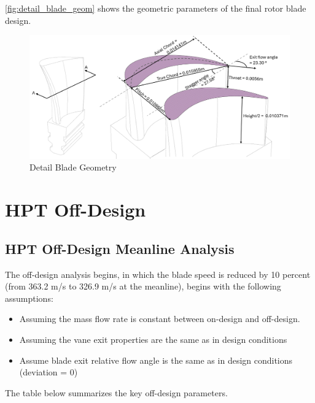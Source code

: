\documentclass[12pt, letter]{report}
\begin{document}
\autoref{fig:detail_blade_geom} shows the geometric parameters of the final rotor blade design.
\begin{figure}[H]
    \centering
    \includegraphics[width=0.99\linewidth]{figures/blade_detail_geom.png}
    \caption{Detail Blade Geometry}
    \label{fig:detail_blade_geom}
\end{figure}


\clearpage

\section{HPT Off-Design}
\subsection{HPT Off-Design Meanline Analysis}

 The off-design analysis begins, in which the blade speed is reduced by 10 percent (from 363.2 m/s to 326.9 m/s at the meanline), begins with the following assumptions:
\begin{itemize}
\item Assuming the mass flow rate is constant between on-design and off-design.
\item Assuming the vane exit properties are the same as in design conditions
\item Assume blade exit relative flow angle is the same as in design conditions (deviation = 0)
\end{itemize}

The table below summarizes the key off-design parameters.
\end{document}

